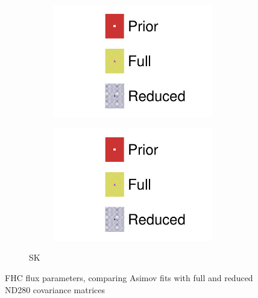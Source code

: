 \begin{figure}[h]
\begin{subfigure}[t]{\textwidth}
\begin{subfigure}[t]{0.24\textwidth}
	\includegraphics[width=\textwidth,page=12, trim={0mm 0mm 0mm 9mm}, clip]{figures/mach3/2018/asimov/2018a_FixedCov_FullCov_Mpi_Asimov_merg_2018a_FixedCov_RedCov_Mpi_Asimov_merge}
\end{subfigure}
\begin{subfigure}[t]{0.24\textwidth}
	\includegraphics[width=\textwidth,page=13, trim={0mm 0mm 0mm 9mm}, clip]{figures/mach3/2018/asimov/2018a_FixedCov_FullCov_Mpi_Asimov_merg_2018a_FixedCov_RedCov_Mpi_Asimov_merge}
\end{subfigure}
\caption{SK}
\end{subfigure}
	\caption{FHC flux parameters, comparing Asimov fits with full and reduced ND280 covariance matrices}
	\label{fig:asimov_fit_2018_full_red_beam_fhc}
\end{figure}

